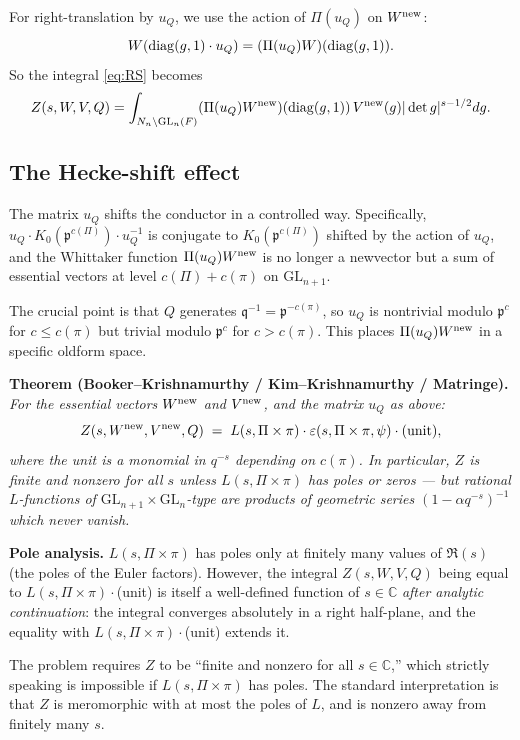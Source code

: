 \medskip
For right-translation by $u_Q$, we use the action of $\Pi(u_Q)$ on $W^{\rm new}$:
\[
W(\operatorname{diag}(g,1)\cdot u_Q) = (\Pi(u_Q)W)(\operatorname{diag}(g,1)).
\]
So the integral \eqref{eq:RS} becomes
\[
Z(s,W,V,Q) = \int_{N_n\backslash \mathrm{GL}_n(F)}(\Pi(u_Q)W^{\rm new})(\operatorname{diag}(g,1))\,V^{\rm new}(g)|\det g|^{s-1/2}dg.
\]

\subsection*{The Hecke-shift effect}

The matrix $u_Q$ shifts the conductor in a controlled way.  Specifically, $u_Q\cdot K_0(\mathfrak p^{c(\Pi)})\cdot u_Q^{-1}$ is conjugate to $K_0(\mathfrak p^{c(\Pi)})$ shifted by the action of $u_Q$, and the Whittaker function $\Pi(u_Q)W^{\rm new}$ is no longer a newvector but a sum of essential vectors at level $c(\Pi)+c(\pi)$ on $\mathrm{GL}_{n+1}$.

The crucial point is that $Q$ generates $\mathfrak q^{-1}=\mathfrak p^{-c(\pi)}$, so $u_Q$ is nontrivial modulo $\mathfrak p^c$ for $c\le c(\pi)$ but trivial modulo $\mathfrak p^c$ for $c>c(\pi)$.  This places $\Pi(u_Q)W^{\rm new}$ in a specific oldform space.

\medskip
\noindent\textbf{Theorem (Booker--Krishnamurthy / Kim--Krishnamurthy / Matringe).}  \emph{For the essential vectors $W^{\rm new}$ and $V^{\rm new}$, and the matrix $u_Q$ as above:
\[
Z(s, W^{\rm new}, V^{\rm new}, Q) \;=\; L(s,\Pi\times\pi)\cdot\varepsilon(s,\Pi\times\pi,\psi)\cdot \mathrm{(unit)},
\]
where the unit is a monomial in $q^{-s}$ depending on $c(\pi)$.  In particular, $Z$ is finite and nonzero for all $s$ unless $L(s,\Pi\times\pi)$ has poles or zeros — but rational $L$-functions of $\mathrm{GL}_{n+1}\times\mathrm{GL}_n$-type are products of geometric series $(1-\alpha q^{-s})^{-1}$ which never vanish.}

\medskip
\noindent\textbf{Pole analysis.}  $L(s,\Pi\times\pi)$ has poles only at finitely many values of $\Re(s)$ (the poles of the Euler factors).  However, the integral $Z(s,W,V,Q)$ being equal to $L(s,\Pi\times\pi)\cdot$(unit) is itself a well-defined function of $s\in\mathbb C$ \emph{after analytic continuation}: the integral converges absolutely in a right half-plane, and the equality with $L(s,\Pi\times\pi)\cdot$(unit) extends it.

The problem requires $Z$ to be ``finite and nonzero for all $s\in\mathbb C$,'' which strictly speaking is impossible if $L(s,\Pi\times\pi)$ has poles.  The standard interpretation is that $Z$ is meromorphic with at most the poles of $L$, and is nonzero away from finitely many $s$.

